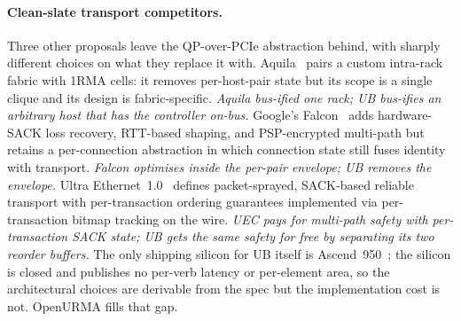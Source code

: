\documentclass[10pt,twocolumn]{article}
\begin{document}
\paragraph{Clean-slate transport competitors.}
Three other proposals leave the QP-over-PCIe abstraction
behind, with sharply different choices on what they replace it
with. Aquila~\cite{gibson2022:aquila} pairs a custom intra-rack
fabric with 1RMA cells: it removes per-host-pair state but its
scope is a single clique and its design is fabric-specific.
\emph{Aquila bus-ified one rack; UB bus-ifies an arbitrary host
that has the controller on-bus.} Google's
Falcon~\cite{google2025:falcon} adds hardware-SACK loss
recovery, RTT-based shaping, and PSP-encrypted multi-path but
retains a per-connection abstraction in which connection state
still fuses identity with transport. \emph{Falcon optimises
inside the per-pair envelope; UB removes the envelope.} Ultra
Ethernet~1.0~\cite{uec2025:spec} defines packet-sprayed,
SACK-based reliable transport with per-transaction ordering
guarantees implemented via per-transaction bitmap tracking on
the wire. \emph{UEC pays for multi-path safety with per-transaction
SACK state; UB gets the same safety for free by separating its two
reorder buffers.} The only shipping silicon for UB itself is
Ascend~950~\cite{huawei2026:ascend950}; the silicon is closed
and publishes no per-verb latency or per-element area, so the
architectural choices are derivable from the spec but the
implementation cost is not. OpenURMA fills that gap.
\end{document}
